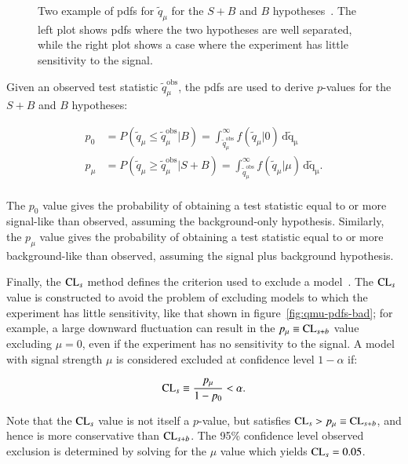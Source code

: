 \begin{appendices}
\begin{figure}[htbp]
{  }
  \hfill
  \caption[Two example of pdfs for $\tilde{q}_{\mu}$ for the $S+B$ and $B$ hypotheses. The left plot shows pdfs where the two hypotheses are well separated, while the right plot shows a case where the experiment has little sensitivity to the signal.]{Two example of pdfs for $\tilde{q}_{\mu}$ for the $S+B$ and $B$ hypotheses~\cite{atlascls}. The left plot shows pdfs where the two hypotheses are well separated, while the right plot shows a case where the experiment has little sensitivity to the signal.}
  \label{fig:qmu-pdfs}
\end{figure}

Given an observed test statistic $\tilde{q}_{\mu}^{\mathrm{obs}}$, the pdfs are used to derive $p$-values for the $S+B$ and $B$ hypotheses:

\begin{align}\label{eqn:p-values}
	p_0 &= P(\tilde{q}_{\mu}\leq \tilde{q}_{\mu}^{\mathrm{obs}}|B)=  \int_{\tilde{q}_{\mu}^{\mathrm{obs}}}^{\infty} f(\tilde{q}_{\mu}|0)\,\mathrm{d\tilde{q}_{\mu}} \\
	p_{\mu} &= P(\tilde{q}_{\mu}\geq \tilde{q}_{\mu}^{\mathrm{obs}}|S+B) = \int_{\tilde{q}_{\mu}^{\mathrm{obs}}}^{\infty} f(\tilde{q}_{\mu}|\mu)\,\mathrm{d\tilde{q}_{\mu}}. \\
\end{align}

The $p_0$ value gives the probability of obtaining a test statistic equal to or more signal-like than observed, assuming the background-only hypothesis. Similarly, the $p_{\mu}$ value gives the probability of obtaining a test statistic equal to or more background-like than observed, assuming the signal plus background hypothesis. 

Finally, the $\mathrm{CL}_s$ method defines the criterion used to exclude a model~\cite{cls}. The $\mathrm{CL}_s$ value is constructed to avoid the problem of excluding models to which the experiment has little sensitivity, like that shown in figure~\ref{fig:qmu-pdfs-bad}; for example, a large downward fluctuation can result in the $p_{\mu}\equiv \mathrm{CL}_{s+b}$ value excluding $\mu=0$, even if the experiment has no sensitivity to the signal. A model with signal strength $\mu$ is considered excluded at confidence level $1-\alpha$ if:

\begin{equation}\label{eqn:cls}
	\mathrm{CL}_s \equiv \frac{p_{\mu}}{1-p_0} < \alpha.
\end{equation}

Note that the $\mathrm{CL}_s$ value is not itself a $p$-value, but satisfies $\mathrm{CL}_s > p_{\mu}\equiv \mathrm{CL}_{s+b}$, and hence is more conservative than $\mathrm{CL}_{s+b}$. The 95\% confidence level observed exclusion is determined by solving for the $\mu$ value which yields $\mathrm{CL}_s=0.05$.



\printbibliography

\end{appendices}

